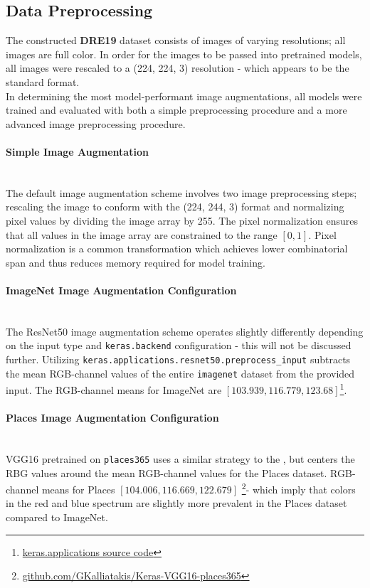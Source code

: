 \subsection{Data Preprocessing}
The constructed \textbf{DRE19} dataset consists of images of varying resolutions; all images are full color. 
In order for the images to be passed into pretrained models, all images were rescaled to a (224, 224, 3) resolution - which appears to be the standard format.
\\
In determining the most model-performant image augmentations, all models were trained and evaluated with both a simple preprocessing procedure and a more advanced image preprocessing procedure. 

\paragraph{Simple Image Augmentation} ~\\
The default image augmentation scheme involves two image preprocessing steps; rescaling the image to conform with the (224, 244, 3) format and normalizing pixel values by dividing the image array by 255. 
The pixel normalization ensures that all values in the image array are constrained to the range $[0,1]$. 
Pixel normalization is a common transformation which achieves lower combinatorial span and thus reduces memory required for model training.

\paragraph{ImageNet Image Augmentation Configuration}\label{par:resnet50} ~\\
The ResNet50 image augmentation scheme operates slightly differently depending on the input type and \texttt{keras.backend} configuration - this will not be discussed further. 
Utilizing \texttt{keras.applications.resnet50.preprocess\_input} subtracts the mean RGB-channel values of the entire \texttt{imagenet} dataset from the provided input. 
The RGB-channel means for ImageNet are $[103.939, 116.779, 123.68]$\footnote{\href{https://github.com/keras-team/keras-applications/tree/8a1e4d427999c26d1a1988dda45454769c4372a5/keras_applications}{keras.applications source code}}.

\paragraph{Places Image Augmentation Configuration} ~\\
VGG16 pretrained on \texttt{places365}\autocite{gkallia2017keras_places365} uses a similar strategy to the , but centers the RBG values around the mean RGB-channel values for the Places dataset. 
RGB-channel means for Places $[104.006, 116.669, 122.679]$ \footnote{\href{https://github.com/GKalliatakis/Keras-VGG16-places365/commit/bdadf6a4ddbb1cc56e6826f0bb375bafd3cd0c1a#diff-a6d65babe02b4e2cca2d2c981f7e1e7f}{github.com/GKalliatakis/Keras-VGG16-places365}}- which imply that colors in the red and blue spectrum are slightly more prevalent in the Places dataset compared to ImageNet.

